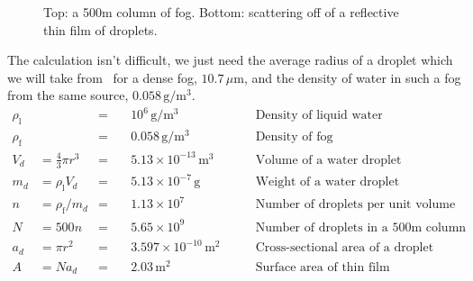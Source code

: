 \begin{figure}[h]
\par\vspace{\baselineskip}
  \caption{Top: a 500m column of fog. Bottom: scattering off of a
    reflective thin film of droplets.}
  \label{fig:column-fog}
\end{figure}
The calculation isn't difficult, we just need the average radius of a
droplet which we will take from~\cite{hess_optical_1998} for a dense
fog, $10.7\,\mu\text{m}$, and the density of water in such a fog from
the same source, $0.058\,\text{g}/\text{m}^3$. 
\begin{align}
  \rho_{\text{l}} &&=&\quad 10^6\,\text{g}/\text{m}^3 
  &\qquad\text{Density of liquid water}\\
  \rho_{\text{f}} &&=&\quad 0.058\,\text{g}/\text{m}^3
  &\qquad\text{Density of fog}\\
  V_d &= \frac{4}{3}\pi r^3 &=&\quad 5.13\times 10^{-13}\,\text{m}^3
  &\qquad\text{Volume of a water droplet}\\ 
  m_d &= \rho_{\text{l}} V_d &=&\quad 5.13\times 10^{-7}\,\text{g}
  &\qquad\text{Weight of a water droplet}\\
  n &= \rho_{\text{f}}/m_d &=&\quad 1.13\times 10^{7}
  &\qquad\text{Number of droplets per unit volume}\\
  N &= 500n &=&\quad 5.65\times 10^{9}
  &\qquad\text{Number of droplets in a 500m column}\\
  a_d &= \pi r^2 &=&\quad 3.597\times 10^{-10}\,\text{m}^2
  &\qquad \text{Cross-sectional area of a droplet}\\
  A &= Na_d &=&\quad 2.03\,\text{m}^2
  &\qquad \text{Surface area of thin film}
\end{align}

